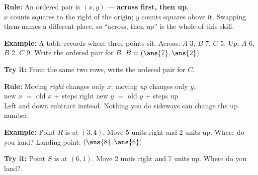 \documentclass[12pt]{article}
\begin{document}


\begin{formulabox}
\textbf{Rule:} An ordered pair is $(x, y)$ --- \textbf{across first, then up}.\\[3pt]
$x$ counts squares to the right of the origin; $y$ counts squares above it. Swapping them names a different place, so ``across, then up'' is the whole of this skill.
\end{formulabox}

\begin{examplebox}
\textbf{Example:} \quad A table records where three points sit. Across: $A$ 3, $B$ 7, $C$ 5. Up: $A$ 6, $B$ 2, $C$ 9. Write the ordered pair for $B$.
$B = (\ans{7}, \ans{2})$
\end{examplebox}

\begin{tryitbox}
\textbf{Try it:} \quad From the same two rows, write the ordered pair for $C$.\\[2pt]
\end{tryitbox}


\begin{formulabox}
\textbf{Rule:} Moving \emph{right} changes only $x$; moving \emph{up} changes only $y$.\\[3pt]
new $x$ $=$ old $x$ $+$ steps right \qquad new $y$ $=$ old $y$ $+$ steps up\\[3pt]
Left and down subtract instead. Nothing you do sideways can change the up number.
\end{formulabox}

\begin{examplebox}
\textbf{Example:} \quad Point $R$ is at $(3, 4)$. Move 5 units right and 2 units up. Where do you land?
Landing point: $(\ans{8}, \ans{6})$
\end{examplebox}

\begin{tryitbox}
\textbf{Try it:} \quad Point $S$ is at $(6, 1)$. Move 2 units right and 7 units up. Where do you land?\\[2pt]
\end{tryitbox}
\end{document}
